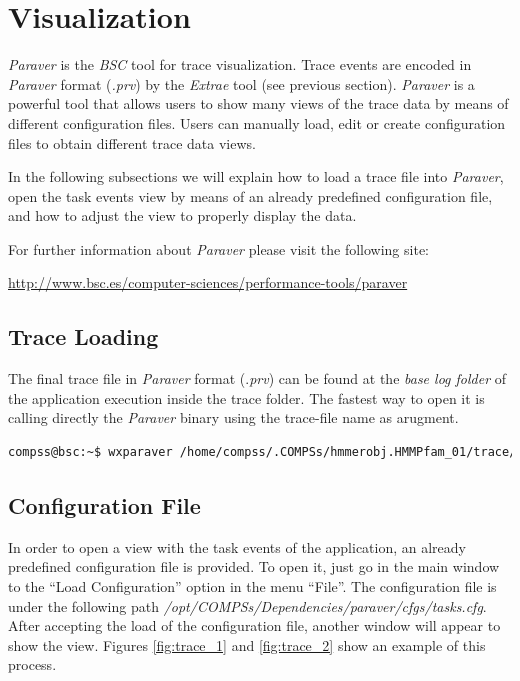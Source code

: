 \section{Visualization}
\label{sec:Visualization}

\textit{Paraver} is the \textit{BSC} tool for trace visualization. Trace events are encoded in \textit{Paraver} format (\textit{.prv}) 
by the \textit{Extrae} tool (see previous section). \textit{Paraver} is a powerful tool that allows users to show many 
views of the trace data by means of different configuration files. Users can manually load, edit or create configuration files to
obtain different trace data views. 

In the following subsections we will explain how to load a trace file into \textit{Paraver}, open the task 
events view by means of an already predefined configuration file, and how to 
adjust the view to properly display the data.

For further information about \textit{Paraver} please visit the following site:
\begin{center}
\url{http://www.bsc.es/computer-sciences/performance-tools/paraver}
\end{center}

\subsection{Trace Loading}
The final trace file in \textit{Paraver} format (.\textit{prv}) can be found at the \textit{base log folder} of the application
execution inside the trace folder. The fastest way to open it is calling directly the \textit{Paraver} binary using the trace-file name
as arugment.
\begin{lstlisting}[language=bash]
compss@bsc:~$ wxparaver /home/compss/.COMPSs/hmmerobj.HMMPfam_01/trace/*.prv
\end{lstlisting}
 
\subsection{Configuration File}
In order to open a view with the task events of the application, an already predefined configuration 
file is provided. To open it, just go in the main window to the ``Load Configuration'' option in 
the menu ``File''. The configuration file is under the following path \textit{/opt/COMPSs/Dependencies/paraver/cfgs/tasks.cfg}. 
After accepting the load of the configuration file, another window will appear to show the view. Figures \ref{fig:trace_1} and
\ref{fig:trace_2} show an example of this process.

